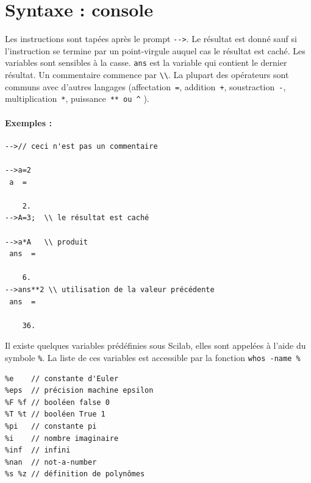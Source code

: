 \section{Syntaxe : console}
Les instructions sont tapées après le prompt \verb?-->?. Le résultat est donné 
sauf si l'instruction se termine par un point-virgule auquel cas le résultat 
est caché. Les variables sont sensibles à la casse. \verb?ans? est la variable 
qui contient le dernier résultat. Un commentaire commence par  \verb?\\?. 
La plupart des opérateurs sont communs avec d'autres langages 
(affectation~\verb?=?, addition~\verb?+?, soustraction~\verb?-?, 
multiplication~\verb?*?, puissance~\verb?** ou ^? ).

\paragraph{Exemples :}
\begin{code}
\begin{verbatim}
-->// ceci n'est pas un commentaire

-->a=2
 a  =
      
    2. 
-->A=3;  \\ le résultat est caché

-->a*A   \\ produit
 ans  =

    6.  
-->ans**2 \\ utilisation de la valeur précédente
 ans  =
  
    36.  
\end{verbatim}
\end{code}

Il existe quelques variables prédéfinies sous Scilab, elles sont appelées à 
l'aide du symbole \og\verb?%?\fg. La liste de ces variables est accessible 
par la fonction \verb?whos -name %?
\begin{code}
\begin{verbatim}
%e    // constante d'Euler
%eps  // précision machine epsilon
%F %f // booléen false 0 
%T %t // booléen True 1 
%pi   // constante pi
%i    // nombre imaginaire
%inf  // infini
%nan  // not-a-number
%s %z // définition de polynômes
\end{verbatim}
\end{code}


